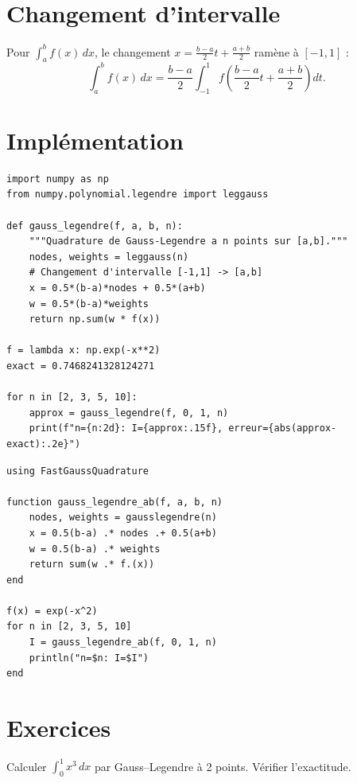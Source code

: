 \section{Changement d'intervalle}

Pour $\int_a^b f(x)\,dx$, le changement $x=\frac{b-a}{2}t+\frac{a+b}{2}$ ram\`ene \`a $[-1,1]$ :
\[
\int_a^b f(x)\,dx = \frac{b-a}{2}\int_{-1}^1 f\!\left(\frac{b-a}{2}t+\frac{a+b}{2}\right)dt.
\]

\section{Impl\'ementation}

\begin{codeblock}[title=\textbf{Python}]
\begin{verbatim}
import numpy as np
from numpy.polynomial.legendre import leggauss

def gauss_legendre(f, a, b, n):
    """Quadrature de Gauss-Legendre a n points sur [a,b]."""
    nodes, weights = leggauss(n)
    # Changement d'intervalle [-1,1] -> [a,b]
    x = 0.5*(b-a)*nodes + 0.5*(a+b)
    w = 0.5*(b-a)*weights
    return np.sum(w * f(x))

f = lambda x: np.exp(-x**2)
exact = 0.7468241328124271

for n in [2, 3, 5, 10]:
    approx = gauss_legendre(f, 0, 1, n)
    print(f"n={n:2d}: I={approx:.15f}, erreur={abs(approx-exact):.2e}")
\end{verbatim}
\end{codeblock}

\begin{codeblock}[title=\textbf{Julia}]
\begin{verbatim}
using FastGaussQuadrature

function gauss_legendre_ab(f, a, b, n)
    nodes, weights = gausslegendre(n)
    x = 0.5(b-a) .* nodes .+ 0.5(a+b)
    w = 0.5(b-a) .* weights
    return sum(w .* f.(x))
end

f(x) = exp(-x^2)
for n in [2, 3, 5, 10]
    I = gauss_legendre_ab(f, 0, 1, n)
    println("n=$n: I=$I")
end
\end{verbatim}
\end{codeblock}

\section{Exercices}

\begin{exercice}[$\star$]
Calculer $\int_0^1 x^3\,dx$ par Gauss--Legendre \`a 2 points. V\'erifier l'exactitude.
\end{exercice}

